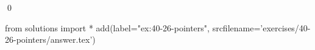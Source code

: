 
\begin{ex}
  \label{ex:40-26-pointers}
  
  \qed
\end{ex}
\begin{python0}
from solutions import *
add(label="ex:40-26-pointers",
    srcfilename='exercises/40-26-pointers/answer.tex')
\end{python0}
